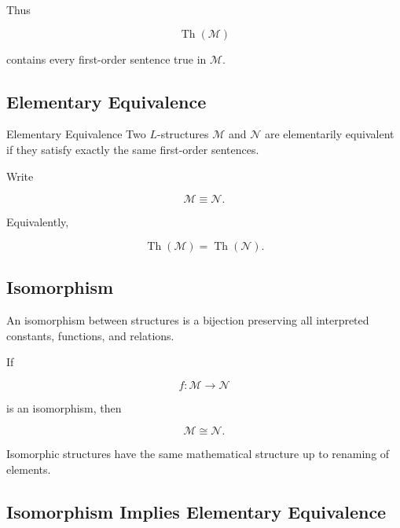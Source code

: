 Thus

\[
\operatorname{Th}(\mathcal{M})
\]

contains every first-order sentence true in \(\mathcal{M}\).

\subsection{Elementary Equivalence}
\label{subsec:elementary-equivalence}

\begin{definitionbox}{Elementary Equivalence}
Two \(L\)-structures \(\mathcal{M}\) and \(\mathcal{N}\) are elementarily
equivalent if they satisfy exactly the same first-order sentences.

Write

\[
\boxed{
\mathcal{M}
\equiv
\mathcal{N}.
}
\]
\end{definitionbox}

Equivalently,

\[
\boxed{
\operatorname{Th}(\mathcal{M})
=
\operatorname{Th}(\mathcal{N}).
}
\]

\subsection{Isomorphism}
\label{subsec:model-theoretic-isomorphism}

An isomorphism between structures is a bijection preserving all interpreted
constants, functions, and relations.

If

\[
f:\mathcal{M}\to\mathcal{N}
\]

is an isomorphism, then

\[
\boxed{
\mathcal{M}\cong\mathcal{N}.
}
\]

Isomorphic structures have the same mathematical structure up to renaming
of elements.

\subsection{Isomorphism Implies Elementary Equivalence}
\label{subsec:isomorphism-elementary-equivalence}

